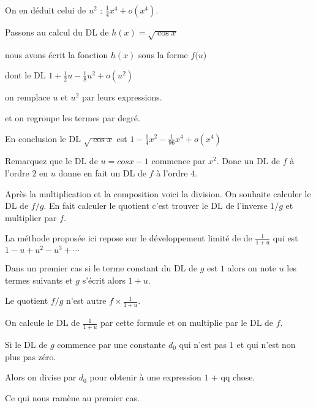 \change

On en déduit celui de $u^2$ : $\frac{1}{4}x^4 + o(x^4)$.

\change

Passons au calcul du DL de $h(x)=\sqrt{\cos x}$ 

\change

nous avons écrit la fonction $h(x)$
sous la forme $f\big(u\big)$ 

\change

dont le DL $1+\frac{1}{2}u-\frac{1}{8}u^2 + o(u^2)$

\change 

on remplace $u$ et $u^2$ par leurs expressions.

\change

et on regroupe les termes par degré.


\change

En conclusion le DL $\sqrt{\cos x}$
est $1-\frac{1}{4}x^2-\frac{1}{96}x^4+o(x^4)$


Remarquez que le DL de $u=cos x -1$ commence par $x^2$.
Donc un DL de $f$ à l'ordre $2$ en $u$ donne en fait 
un DL de $f$ à l'ordre $4$.




\diapo

Après la multiplication et la composition voici la division.
On souhaite calculer le DL de $f/g$.
En fait calculer le quotient c'est trouver le DL de l'inverse $1/g$ et multiplier par $f$.

\change

La méthode proposée ici repose sur le développement limité de 
de $\frac{1}{1+u}$ qui est $1-u+u^2-u^3+\cdots$

\change

Dans un premier cas si le terme constant du DL de $g$ est $1$ alors on note $u$
les termes suivants et $g$ s'écrit alors $1+u$.

\change

Le quotient $f/g$ n'est autre $f \times \frac{1}{1+u}$.

On calcule le DL de $\frac{1}{1+u}$ par cette formule et on multiplie par le DL de $f$.

\change

Si le DL de $g$ commence par une constante $d_0$ qui n'est pas $1$ et qui n'est non plus pas zéro.

Alors on divise par $d_0$ pour obtenir à une expression $1$ + qq chose.

Ce qui nous ramène au premier cas.


